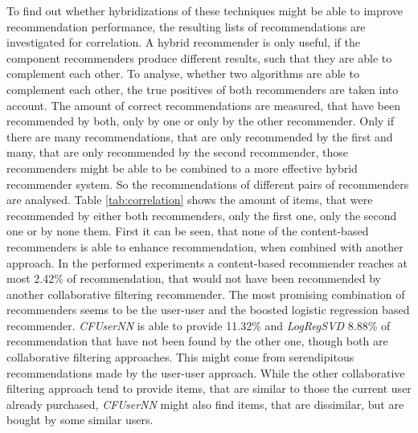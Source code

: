 \documentclass[10pt]{reportMaster}
\begin{document}

To find out whether hybridizations of these techniques might be able to improve recommendation performance, the resulting lists of recommendations are investigated for correlation.
A hybrid recommender is only useful, if the component recommenders produce different results, such that they are able to complement each other.
To analyse, whether two algorithms are able to complement each other, the true positives of both recommenders are taken into account.
The amount of correct recommendations are measured, that have been recommended by both, only by one or only by the other recommender.
Only if there are many recommendations, that are only recommended by the first and many, that are only recommended by the second recommender, those recommenders might be able to be combined to a more effective hybrid recommender system.
So the recommendations of different pairs of recommenders are analysed.
Table \ref{tab:correlation} shows the amount of items, that were recommended by either both recommenders, only the first one, only the second one or by none them.
First it can be seen, that none of the content-based recommenders is able to enhance recommendation, when combined with another approach.
In the performed experiments a content-based recommender reaches at most 2.42\% of recommendation, that would not have been recommended by another collaborative filtering recommender.
The most promising combination of recommenders seems to be the user-user and the boosted logistic regression based recommender.
\textit{CFUserNN} is able to provide 11.32\% and \textit{LogRegSVD} 8.88\% of recommendation that have not been found by the other one, though both are collaborative filtering approaches.
This might come from serendipitous recommendations made by the user-user approach.
While the other collaborative filtering approach tend to provide items, that are similar to those the current user already purchased, \textit{CFUserNN} might also find items, that are dissimilar, but are bought by some similar users.
\end{document}
